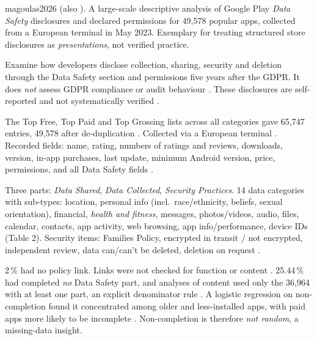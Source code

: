 \begin{papercard}{magoulas2026}
   (also ). A large-scale descriptive analysis of Google Play \emph{Data Safety} disclosures and declared permissions for 49{,}578 popular apps, collected from a European terminal in May 2023. Exemplary for treating structured store disclosures as \emph{presentations}, not verified practice.

 Examine how developers disclose collection, sharing, security and deletion through the Data Safety section and permissions five years after the GDPR. It does \emph{not} assess GDPR compliance or audit behaviour . These disclosures are self-reported and not systematically verified .

 The Top Free, Top Paid and Top Grossing lists across all categories gave 65{,}747 entries, 49{,}578 after de-duplication . Collected via a European terminal . Recorded fields: name, rating, numbers of ratings and reviews, downloads, version, in-app purchases, last update, minimum Android version, price, permissions, and all Data Safety fields .

 Three parts: \emph{Data Shared}, \emph{Data Collected}, \emph{Security Practices}. 14 data categories with sub-types: location, personal info (incl.\ race/ethnicity, beliefs, sexual orientation), financial, \emph{health and fitness}, messages, photos/videos, audio, files, calendar, contacts, app activity, web browsing, app info/performance, device IDs (Table 2). Security items: Families Policy, encrypted in transit / not encrypted, independent review, data can/can't be deleted, deletion on request .

 2\,\% had no policy link. Links were not checked for function or content . 25.44\,\% had completed \emph{no} Data Safety part, and analyses of content used only the 36{,}964 with at least one part, an explicit denominator rule . A logistic regression on non-completion found it concentrated among older and less-installed apps, with paid apps more likely to be incomplete . Non-completion is therefore \emph{not random}, a missing-data insight.


\end{papercard}
